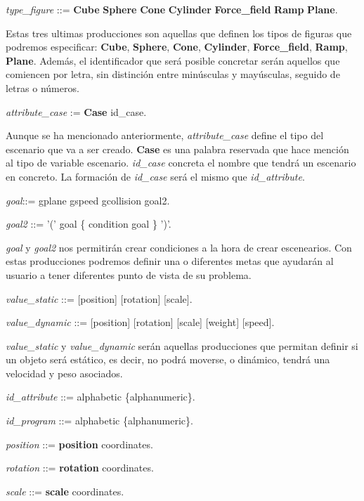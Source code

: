 \documentclass[12pt]{article}
\begin{document}
\noindent \textit{type\_figure} ::= \textbf{Cube} \textbar \textbf{Sphere} \textbar \textbf{Cone} \textbar \textbf{Cylinder} \textbar \textbf{Force\_field} \textbar \textbf{Ramp} \textbar  \textbf{Plane}.

Estas tres ultimas producciones son aquellas que definen los tipos de figuras que podremos especificar: \textbf{Cube}, \textbf{Sphere}, \textbf{Cone}, \textbf{Cylinder}, \textbf{Force\_field}, \textbf{Ramp}, \textbf{Plane}. Además, el identificador que será posible concretar serán aquellos que comiencen por letra, sin distinción entre minúsculas y mayúsculas, seguido de letras o números.

\noindent \textit{attribute\_case} := \textbf{Case} id\_case.

Aunque se ha mencionado anteriormente, \textit{attribute\_case} define el tipo del escenario que va a ser creado.  \textbf{Case} es una palabra reservada que hace mención al tipo de variable escenario. \textit{id\_case} concreta el nombre que tendrá un escenario en concreto. La formación de \textit{id\_case} será el mismo que \textit{id\_attribute}.

\noindent \textit{goal}::=  gplane \textbar gspeed \textbar gcollision \textbar goal2.

\noindent \textit{goal2} ::= '(' goal \{ condition goal \} ')'.

\textit{goal} y \textit{goal2} nos permitirán crear condiciones a la hora de crear escenearios. Con estas producciones podremos definir una o diferentes metas que ayudarán al usuario a tener diferentes punto de vista de su problema.

\noindent \textit{value\_static} ::= [position] [rotation] [scale].

\noindent \textit{value\_dynamic} ::= [position] [rotation] [scale] [weight] [speed].

\textit{value\_static} y \textit{value\_dynamic} serán aquellas producciones que permitan definir si un objeto será estático, es decir, no podrá moverse, o dinámico, tendrá una velocidad y peso asociados.

\noindent \textit{id\_attribute} ::= alphabetic \{alphanumeric\}.

\noindent \textit{id\_program} ::= alphabetic \{alphanumeric\}.

\noindent \textit{position} ::= \textbf{position} coordinates.

\noindent \textit{rotation} ::= \textbf{rotation} coordinates.

\noindent \textit{scale} ::=  \textbf{scale} coordinates.
\end{document}

